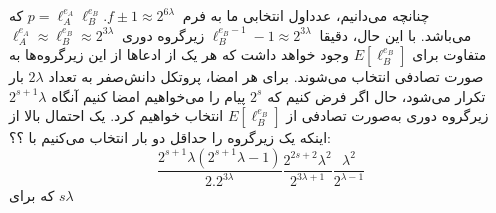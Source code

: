 چنانچه می‌دانیم، عدداول انتخابی ما به فرم
$p = \ell_A^{e_A}  \ell_B^{e_B} .f \pm 1 \approx 2^{6\lambda} ~$
که
\\
$\ell_A^{e_A} \approx \ell_B^{e_B} \approx 2^{3\lambda} ~$
می‌باشد. با این حال، دقیقا
$\ell_B^{e_B-1} - 1 \approx 2^{3\lambda} ~$
زیرگروه دوری متفاوت برای 
$E[\ell_B^{e_B}]$
وجود خواهد داشت که هر یک از ادعاها از این زیرگروه‌ها به صورت تصادفی انتخاب می‌شوند.
برای هر امضا، پروتکل دانش‌صفر به تعداد
$2\lambda$
بار تکرار می‌شود، حال اگر فرض کنیم که
$2^s$
پیام را می‌خواهیم امضا کنیم آنگاه 
$2^{s+1} \lambda$
زیرگروه دوری به‌صورت تصادفی از
$E[\ell_B^{e_B}]$
انتخاب خواهیم کرد. یک احتمال بالا از اینکه یک زیرگروه را حداقل دو بار انتخاب می‌کنیم با ؟؟‌:
$$
\frac{2^{s+1}\lambda (2^{s+1}\lambda -1)}{2 . 2^{3\lambda}} 
\frac{2^{2s+2}{\lambda}^2}{2^{3\lambda+1}}
\frac{\lambda^2}{2^{\lambda -1 }}
$$
که برای
$s \lambda$







